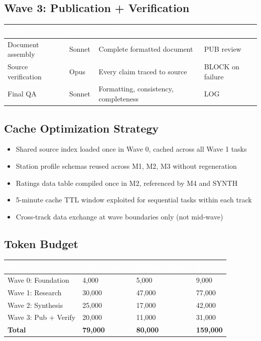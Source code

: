 \documentclass[11pt,letterpaper]{article}
\newcommand{\tableheader}[1]{\textbf{\sffamily\textcolor{white}{#1}}}
\begin{document}
\subsection{Wave 3: Publication + Verification}

\begin{center}
\begin{tabularx}{\textwidth}{L{2.5cm}C{1.5cm}XC{1.5cm}}
\toprule
{}
\tableheader{Task} & \tableheader{Model} & \tableheader{Output} & \tableheader{Gate} \\
\midrule
Document assembly & Sonnet & Complete formatted document & PUB review \\
Source verification & Opus & Every claim traced to source & BLOCK on failure \\
Final QA & Sonnet & Formatting, consistency, completeness & LOG \\
\bottomrule
\end{tabularx}
\end{center}

\subsection{Cache Optimization Strategy}

\begin{itemize}[leftmargin=2em]
\item Shared source index loaded once in Wave 0, cached across all Wave 1 tasks
\item Station profile schemas reused across M1, M2, M3 without regeneration
\item Ratings data table compiled once in M2, referenced by M4 and SYNTH
\item 5-minute cache TTL window exploited for sequential tasks within each track
\item Cross-track data exchange at wave boundaries only (not mid-wave)
\end{itemize}

\subsection{Token Budget}

\begin{center}
\begin{tabularx}{\textwidth}{L{3cm}C{2cm}C{2cm}C{2cm}}
\toprule
{}
\tableheader{Wave} & \tableheader{Input Tokens} & \tableheader{Output Tokens} & \tableheader{Total} \\
\midrule
Wave 0: Foundation & 4,000 & 5,000 & 9,000 \\
Wave 1: Research & 30,000 & 47,000 & 77,000 \\
Wave 2: Synthesis & 25,000 & 17,000 & 42,000 \\
Wave 3: Pub + Verify & 20,000 & 11,000 & 31,000 \\
\midrule
\textbf{Total} & \textbf{79,000} & \textbf{80,000} & \textbf{159,000} \\
\bottomrule
\end{tabularx}
\end{center}
\end{document}
